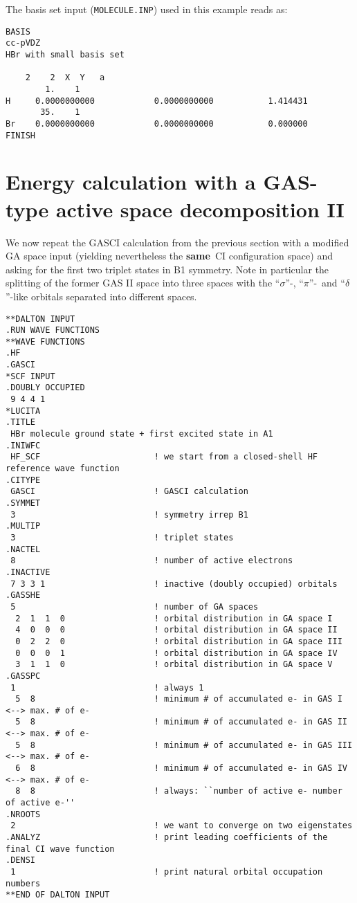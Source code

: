 The basis set input (\verb|MOLECULE.INP|) used in this example reads as:

\begin{verbatim}
BASIS
cc-pVDZ
HBr with small basis set

    2    2  X  Y   a
        1.    1
H     0.0000000000            0.0000000000           1.414431
       35.    1
Br    0.0000000000            0.0000000000           0.000000
FINISH
\end{verbatim}

\section{Energy calculation with a GAS-type active space decomposition II}\label{cc:lucitaex:gas2}

We now repeat the GASCI calculation from the previous section 
with a modified GA space input (yielding nevertheless the {\bf{same}}\ CI configuration space) 
and asking for the first two triplet states in B1 symmetry. 
Note in particular the splitting of the former GAS II space into three 
spaces with the ``$\sigma$''-, ``$\pi$''-\ and ``$\delta$''-like orbitals separated into different spaces. 

%
\begin{verbatim}
**DALTON INPUT
.RUN WAVE FUNCTIONS
**WAVE FUNCTIONS
.HF
.GASCI
*SCF INPUT
.DOUBLY OCCUPIED
 9 4 4 1
*LUCITA
.TITLE
 HBr molecule ground state + first excited state in A1
.INIWFC
 HF_SCF                       ! we start from a closed-shell HF reference wave function
.CITYPE
 GASCI                        ! GASCI calculation
.SYMMET
 3                            ! symmetry irrep B1
.MULTIP
 3                            ! triplet states
.NACTEL
 8                            ! number of active electrons
.INACTIVE
 7 3 3 1                      ! inactive (doubly occupied) orbitals
.GASSHE
 5                            ! number of GA spaces
  2  1  1  0                  ! orbital distribution in GA space I
  4  0  0  0                  ! orbital distribution in GA space II
  0  2  2  0                  ! orbital distribution in GA space III
  0  0  0  1                  ! orbital distribution in GA space IV
  3  1  1  0                  ! orbital distribution in GA space V
.GASSPC
 1                            ! always 1
  5  8                        ! minimum # of accumulated e- in GAS I    <--> max. # of e-
  5  8                        ! minimum # of accumulated e- in GAS II   <--> max. # of e-
  5  8                        ! minimum # of accumulated e- in GAS III  <--> max. # of e-
  6  8                        ! minimum # of accumulated e- in GAS IV   <--> max. # of e-
  8  8                        ! always: ``number of active e- number of active e-''
.NROOTS
 2                            ! we want to converge on two eigenstates
.ANALYZ                       ! print leading coefficients of the final CI wave function
.DENSI
 1                            ! print natural orbital occupation numbers
**END OF DALTON INPUT
\end{verbatim}

